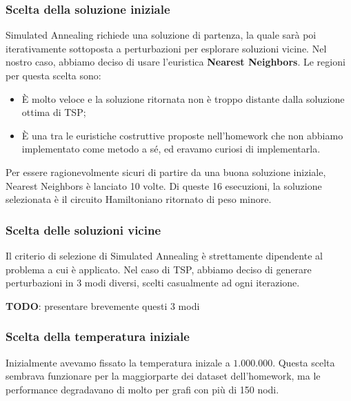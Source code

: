 \subsubsection{Scelta della soluzione iniziale}

Simulated Annealing richiede una soluzione di partenza, la quale sarà poi iterativamente sottoposta a perturbazioni per esplorare soluzioni vicine. Nel nostro caso, abbiamo deciso di usare l'euristica \textbf{Nearest Neighbors}. Le regioni per questa scelta sono:

\begin{itemize}
    \item È molto veloce e la soluzione ritornata non è troppo distante dalla soluzione ottima di TSP;
    \item È una tra le euristiche costruttive proposte nell'homework che non abbiamo implementato come metodo a sé, ed eravamo curiosi di implementarla.
\end{itemize}

Per essere ragionevolmente sicuri di partire da una buona soluzione iniziale, Nearest Neighbors è lanciato 10 volte. Di queste 16 esecuzioni, la soluzione selezionata è il circuito Hamiltoniano ritornato di peso minore.

\subsubsection{Scelta delle soluzioni vicine}

Il criterio di selezione di Simulated Annealing è strettamente dipendente al problema a cui è applicato. Nel caso di TSP, abbiamo deciso di generare perturbazioni in 3 modi diversi, scelti casualmente ad ogni iterazione.

\textbf{TODO}: presentare brevemente questi 3 modi

\subsubsection{Scelta della temperatura iniziale}

Inizialmente avevamo fissato la temperatura inizale a $1.000.000$. Questa scelta sembrava funzionare per la maggiorparte dei dataset dell'homework, ma le performance degradavano di molto per grafi con più di 150 nodi. \\


